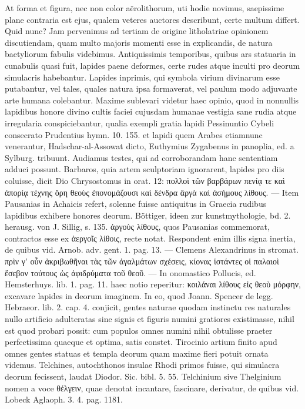 \documentclass[a4paper, 11pt, oneside, polutonikogreek, german]{article}
\begin{document}
At forma et figura, nec non color aërolithorum, uti hodie novimus, saepissime plane contraria est ejus, qualem veteres auctores describunt, certe multum differt. Quid nunc? Jam pervenimus ad tertiam de origine litholatriae opinionem discutiendam, quam multo majoris momenti esse in explicandis, de natura baetyliorum fabulis videbimus. Antiquissimis temporibus, quibus ars statuaria in cunabulis quasi fuit, lapides paene deformes, certe rudes atque inculti pro deorum simulacris habebantur. Lapides inprimis, qui symbola virium divinarum esse putabantur, vel tales, quales natura ipsa formaverat, vel paulum modo adjuvante arte humana colebantur. Maxime sublevari videtur haec opinio, quod in nonnullis lapidibus honore divino cultis faciei cujusdam humanae vestigia sane rudia atque irregularia conspiciebantur, qualia exempli gratia lapidi Pessinuntio Cybeli consecrato Prudentius hymn. 10. 155. et lapidi quem Arabes etiamnunc venerantur, Hadschar-al-Assowat dicto, Euthymius Zygabenus in panoplia, ed. a Sylburg. tribuunt. Audiamus testes, qui ad corroborandam hanc sententiam adduci possunt. Barbaros, quia artem sculptoriam ignorarent, lapides pro diis coluisse, dicit Dio Chrysostomus in orat. 12: πολλοὶ τῶν βαρβάρων πενίᾳ τε καὶ ἀπορίᾳ τέχνης ὄρη θεοὺς ἐπονομάζουσι καὶ δένδρα ἄργὰ καὶ ἀσήμους λίθους. --- Item Pausanias in Achaicis refert, solenne fuisse antiquitus in Graecia rudibus lapidibus exhibere honores deorum. Böttiger, ideen zur kunstmythologie, bd. 2. herausg. von J. Sillig, s. 135. ἀργοὺς λίθους, quos Pausanias commemorat, contractos esse ex ἀεργοῖς λίθοις, recte notat. Respondent enim illis signa inertia, de quibus vid. Arnob. adv. gent. 1. pag. 13. --- Clemens Alexandrinus in stromat. πρὶν γ' οὖν ἀκριβωθῆναι τὰς τῶν ἀγαλμάτων σχέσεις, κίονας ἱστάντες οἱ παλαιοὶ ἔσεβον τούτους ὡς ἀφιδρύματα τοῦ θεοῦ. --- In onomastico Pollucis, ed. Hemsterhuys. lib. 1. pag. 11. haec notio reperitur: κοιλάναι λίθους εἰς θεοὺ μόρφην, excavare lapides in deorum imaginem. In eo, quod Joann. Spencer de legg. Hebraeor. lib. 2. cap. 4. conjicit, gentes naturae quodam instinctu res naturales nullo artificio adulteratas sine signis et figuris numini gratiores existimasse, nihil est quod probari possit: cum populos omnes numini nihil obtulisse praeter perfectissima quaeque et optima, satis constet. Tirocinio artium finito apud omnes gentes statuas et templa deorum quam maxime fieri potuit ornata videmus. Telchines, autochthonos insulae Rhodi primos fuisse, qui simulacra deorum fecissent, laudat Diodor. Sic. bibl. 5. 55. Telchinium sive Thelginium nomen a voce θέλγειν, quae denotat incantare, fascinare, derivatur, de quibus vid. Lobeck Aglaoph. 3. 4. pag. 1181.
\end{document}

